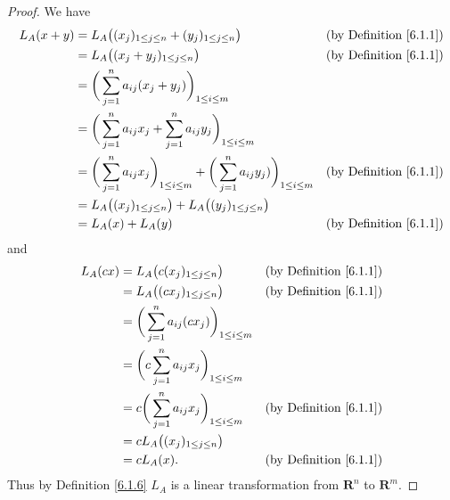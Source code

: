 \begin{proof}
    We have
    \begin{align*}
        L_A(x + y) & = L_A\big((x_j)_{1 \leq j \leq n} + (y_j)_{1 \leq j \leq n}\big)                                                     & \text{(by Definition \ref{6.1.1})} \\
                   & = L_A\big((x_j + y_j)_{1 \leq j \leq n}\big)                                                                         & \text{(by Definition \ref{6.1.1})} \\
                   & = \bigg(\sum_{j = 1}^n a_{ij} (x_j + y_j)\bigg)_{1 \leq i \leq m}                                                                                         \\
                   & = \bigg(\sum_{j = 1}^n a_{ij} x_j + \sum_{j = 1}^n a_{ij} y_j\bigg)_{1 \leq i \leq m}                                                                     \\
                   & = \bigg(\sum_{j = 1}^n a_{ij} x_j\bigg)_{1 \leq i \leq m} + \bigg(\sum_{j = 1}^n a_{ij} y_j)\bigg)_{1 \leq i \leq m} & \text{(by Definition \ref{6.1.1})} \\
                   & = L_A\big((x_j)_{1 \leq j \leq n}\big) + L_A\big((y_j)_{1 \leq j \leq n}\big)                                                                             \\
                   & = L_A(x) + L_A(y)                                                                                                    & \text{(by Definition \ref{6.1.1})}
    \end{align*}
    and
    \begin{align*}
        L_A(cx) & = L_A\big(c(x_j)_{1 \leq j \leq n}\big)                       & \text{(by Definition \ref{6.1.1})} \\
                & = L_A\big((cx_j)_{1 \leq j \leq n}\big)                       & \text{(by Definition \ref{6.1.1})} \\
                & = \bigg(\sum_{j = 1}^n a_{ij} (c x_j)\bigg)_{1 \leq i \leq m}                                      \\
                & = \bigg(c \sum_{j = 1}^n a_{ij} x_j\bigg)_{1 \leq i \leq m}                                        \\
                & = c \bigg(\sum_{j = 1}^n a_{ij} x_j\bigg)_{1 \leq i \leq m}   & \text{(by Definition \ref{6.1.1})} \\
                & = c L_A\big((x_j)_{1 \leq j \leq n}\big)                                                           \\
                & = c L_A(x).                                                   & \text{(by Definition \ref{6.1.1})}
    \end{align*}
    Thus by Definition \ref{6.1.6} \(L_A\) is a linear transformation from \(\mathbf{R}^n\) to \(\mathbf{R}^m\).
\end{proof}

